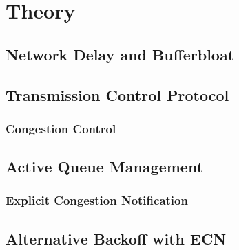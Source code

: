 \chapter{Theory}


\section{Network Delay and Bufferbloat}


\section{Transmission Control Protocol}

\subsection{Congestion Control}



\section{Active Queue Management}

\subsection{Explicit Congestion Notification}



\section{Alternative Backoff with ECN}